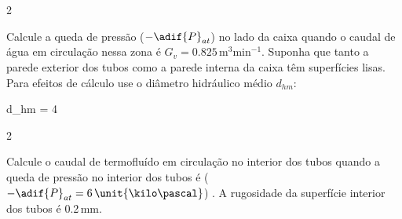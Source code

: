 \documentclass[\mainfilename]{subfiles}
\begin{document}
\begin{questionBox}2{} %
    
    Calcule a queda de pressão (\(-\adif{P}_{at}\)) no lado da caixa quando o caudal de água em circulação nessa zona é \(G_v = 0.825\,\unit{\metre^3\minute^{-1}}\). Suponha que tanto a parede exterior dos tubos como a parede interna da caixa têm superfícies lisas. Para efeitos de cálculo use o diâmetro hidráulico médio \(d_{hm}\):

    \begin{BM}
        d_{hm}
        = 4\,
    \end{BM}
    
\end{questionBox}

\begin{questionBox}2{} %
    
    Calcule o caudal de termofluído em circulação no interior dos tubos quando a queda de pressão no interior dos tubos é (\(-\adif{P}_{at}= 6\,\unit{\kilo\pascal}\)) . A rugosidade da superfície interior dos tubos é 0.2\,\unit{\milli\metre}.
    
\end{questionBox}


    
    
    

    
    
\end{document}
